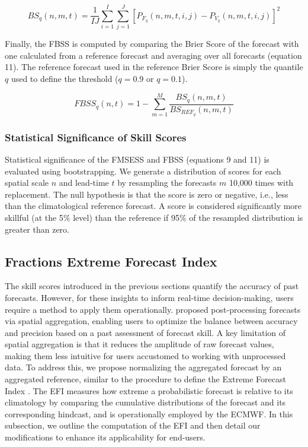 \documentclass[preprint,12pt,authoryear]{elsarticle}
\begin{document}
\begin{equation}
    BS_{q}(n, m, t) = \frac{1}{IJ} \sum_{i=1}^{I}\sum_{j=1}^{J} [P_{F_{q}}(n,m,t,i,j) - P_{V_{q}}(n,m,t,i,j)]^{2}
\end{equation}

Finally, the FBSS is computed by comparing the Brier Score of the forecast with one calculated from a reference forecast and averaging over all forecasts (equation 11). The reference forecast used in the reference Brier Score is simply the quantile $q$ used to define the threshold ($q=0.9$ or $q=0.1$).

\begin{equation}
    FBSS_{q}(n,t) = 1 - \sum_{m=1}^{M} \frac{BS_{q}(n,m,t)}{BS_{REF_{q}}(n,m,t)}
\end{equation}







\subsubsection{Statistical Significance of Skill Scores}

Statistical significance of the FMSESS and FBSS (equations 9 and 11) is evaluated using bootstrapping. We generate a distribution of scores for each spatial scale $n$ and lead-time $t$ by resampling the forecasts $m$ 10,000 times with replacement. The null hypothesis is that the score is zero or negative, i.e., less than the climatological reference forecast. A score is considered significantly more skillful (at the 5$\%$ level) than the reference if 95$\%$ of the resampled distribution is greater than zero.


\subsection{Fractions Extreme Forecast Index}

The skill scores introduced in the previous sections quantify the accuracy of past forecasts. However, for these insights to inform real-time decision-making, users require a method to apply them operationally. \cite{RobertsLean2008} proposed post-processing forecasts via spatial aggregation, enabling users to optimize the balance between accuracy and precision based on a past assessment of forecast skill. A key limitation of spatial aggregation is that it reduces the amplitude of raw forecast values, making them less intuitive for users accustomed to working with unprocessed data. To address this, we propose normalizing the aggregated forecast by an aggregated reference, similar to the procedure to define the Extreme Forecast Index \citep[EFI,][]{Lalaurette2003}. The EFI measures how extreme a probabilistic forecast is relative to its climatology by comparing the cumulative distributions of the forecast and its corresponding hindcast, and is operationally employed by the ECMWF. In this subsection, we outline the computation of the EFI and then detail our modifications to enhance its applicability for end-users.
\end{document}
